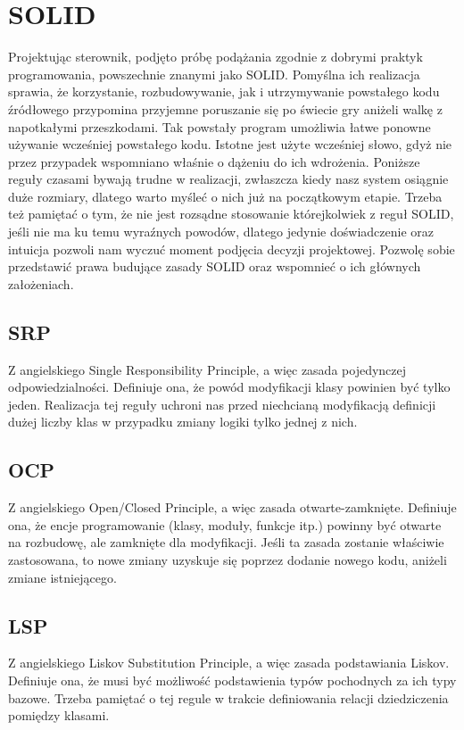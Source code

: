 \chapter{SOLID}
Projektując sterownik, podjęto próbę podążania zgodnie z dobrymi praktyk programowania, powszechnie znanymi jako SOLID.
Pomyślna ich realizacja sprawia, że korzystanie, rozbudowywanie, jak i utrzymywanie powstałego kodu źródłowego przypomina
przyjemne poruszanie się po świecie gry aniżeli walkę z napotkałymi przeszkodami. 
Tak powstały program umożliwia łatwe ponowne używanie wcześniej powstałego kodu. 
Istotne jest użyte wcześniej słowo, gdyż nie przez przypadek wspomniano właśnie o dążeniu do ich wdrożenia.
Poniższe reguły czasami bywają trudne w realizacji, zwłaszcza kiedy nasz system osiągnie duże rozmiary, dlatego warto myśleć o nich już na początkowym etapie. 
Trzeba też pamiętać o tym, że nie jest rozsądne stosowanie którejkolwiek z reguł SOLID, jeśli nie ma ku temu wyraźnych powodów, dlatego 
jedynie doświadczenie oraz intuicja pozwoli nam wyczuć moment podjęcia decyzji projektowej.
Pozwolę sobie przedstawić prawa budujące zasady SOLID oraz wspomnieć o ich głównych założeniach.

\section{SRP}
Z angielskiego Single Responsibility Principle, a więc zasada pojedynczej odpowiedzialności.
Definiuje ona, że powód modyfikacji klasy powinien być tylko jeden. 
Realizacja tej reguły uchroni nas przed niechcianą modyfikacją definicji dużej liczby klas w przypadku zmiany logiki tylko jednej z nich.

\section{OCP}
Z angielskiego Open/Closed Principle, a więc zasada otwarte-zamknięte.
Definiuje ona, że encje programowanie (klasy, moduły, funkcje itp.) powinny być otwarte na rozbudowę, ale zamknięte dla modyfikacji.
Jeśli ta zasada zostanie właściwie zastosowana, to nowe zmiany uzyskuje się poprzez dodanie nowego kodu, aniżeli zmiane istniejącego. 

\section{LSP}
Z angielskiego Liskov Substitution Principle, a więc zasada podstawiania Liskov.
Definiuje ona, że musi być możliwość podstawienia typów pochodnych za ich typy bazowe.
Trzeba pamiętać o tej regule w trakcie definiowania relacji dziedziczenia pomiędzy klasami.


